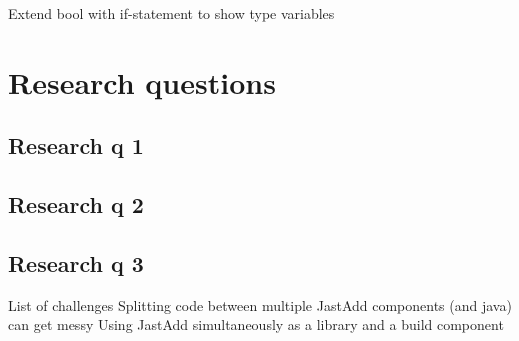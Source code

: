 \documentclass[nofilelist]{cslthse-msc}
\begin{document}
%
Extend bool with if-statement to show type variables
\section{Research questions}
\subsection{Research q 1}
\subsection{Research q 2}
\subsection{Research q 3}
List of challenges %
  Splitting code between multiple JastAdd components (and java) can get messy
  Using JastAdd simultaneously as a library and a build component
\end{document}
